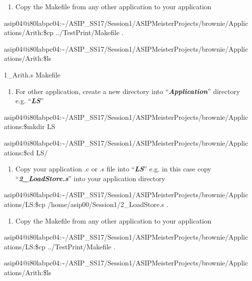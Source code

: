 \documentclass[
]{article}
\begin{document}
\begin{enumerate}
\def\labelenumi{\arabic{enumi}.}
\setcounter{enumi}{9}
\item
  Copy the Makefile from any other application to your application
\end{enumerate}

asip04@i80labpc04:\textasciitilde/ASIP\_SS17/Session1/ASIPMeisterProjects/brownie/Applications/Arith:\$cp
../TestPrint/Makefile .

asip04@i80labpc04:\textasciitilde/ASIP\_SS17/Session1/ASIPMeisterProjects/brownie/Applications/Arith:\$ls

1\_Arith.s Makefile

\begin{enumerate}
\def\labelenumi{\arabic{enumi}.}
\setcounter{enumi}{10}
\item
  For other application, create a new directory into
  ``\emph{\textbf{Application}}'' directory e.g. ``\emph{\textbf{LS}}''
\end{enumerate}

asip04@i80labpc04:\textasciitilde/ASIP\_SS17/Session1/ASIPMeisterProjects/brownie/Applications:\$mkdir
LS

asip04@i80labpc04:\textasciitilde/ASIP\_SS17/Session1/ASIPMeisterProjects/brownie/Applications:\$cd
LS/

\begin{enumerate}
\def\labelenumi{\arabic{enumi}.}
\setcounter{enumi}{11}
\item
  Copy your application .c or .s file into ``\emph{\textbf{LS}}'' e.g.
  in this case copy ``\emph{\textbf{2\_LoadStore.s}}'' into your
  application directory
\end{enumerate}

asip04@i80labpc04:\textasciitilde/ASIP\_SS17/Session1/ASIPMeisterProjects/brownie/Applications/LS:\$cp
/home/asip00/Session1/2\_LoadStore.s .

\begin{enumerate}
\def\labelenumi{\arabic{enumi}.}
\setcounter{enumi}{12}
\item
  Copy the Makefile from any other application to your application
\end{enumerate}

asip04@i80labpc04:\textasciitilde/ASIP\_SS17/Session1/ASIPMeisterProjects/brownie/Applications/LS:\$cp
../TestPrint/Makefile .

asip04@i80labpc04:\textasciitilde/ASIP\_SS17/Session1/ASIPMeisterProjects/brownie/Applications/Arith:\$ls
\end{document}
